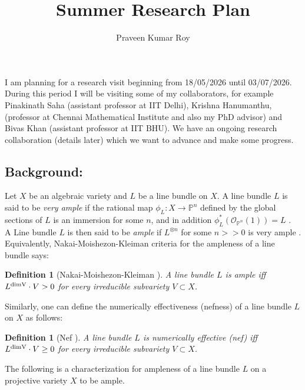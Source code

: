 \documentclass[11pt,reqno,a4paper]{amsart}
\newtheorem{definition}[theorem]{Definition}
\theoremstyle{remark}
\begin{document}
\title[Positivity on simple $G$-varieties]{Summer Research Plan}
\author{Praveen Kumar Roy}


\address{Azim Premji University-Bhopal, India}




\maketitle

I am planning for a research visit beginning from 18/05/2026 until 03/07/2026. During this period I will be visiting some of my collaborators, for example Pinakinath Saha (assistant professor at IIT Delhi), Krishna Hanumanthu, (professor at 
Chennai Mathematical Institute and also my PhD advisor) and Bivas Khan (assistant professor at IIT BHU). We have an ongoing research collaboration (details later) which we want to advance and make some progress.

\subsection*{Background:} Let $X$ be an algebraic variety and $L$ be a line bundle on $X$. A line bundle $L$ is said to be \textit{very ample} if the rational map $\phi_L : X \longrightarrow \mathbb{P}^n$ defined by the global sections of $L$ is an immersion for some $n$, and in addition $ \phi_L^*(\mathcal{O}_{\mathbb{P}^n}(1)) = L$ \cite{Har}. \\

A Line bundle $L$ is then said to be \textit{ample} if $L^{\otimes n}$ for some $n >> 0$ is very ample \cite{Har}. Equivalently, Nakai-Moishezon-Kleiman criteria for the ampleness of a line bundle says:

\begin{definition}[Nakai-Moishezon-Kleiman \cite{Laz}]
A line bundle $L$ is ample iff $L^{\rm{dim} V} \cdot V > 0$ for every irreducible subvariety $V \subset X$.
\end{definition}

Similarly, one can define the numerically effectiveness (nefness) of a line bundle $L$ on $X$ as follows:
\begin{definition}[Nef \cite{Laz}]
A line bundle $L$ is numerically effective (nef) iff $L^{\rm{dim} V} \cdot V \geq 0$ for every irreducible subvariety $V \subset X$.
\end{definition}

The following is a characterization for ampleness of a line bundle $L$ on a projective variety $X$ to be ample.
\end{document}

